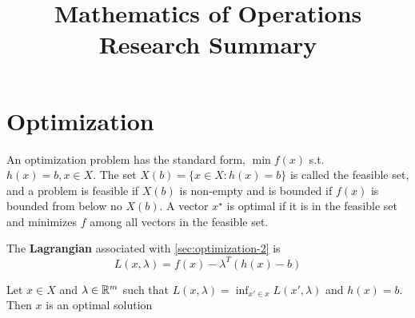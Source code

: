 

\title{Mathematics of Operations Research Summary}



\maketitle

\section{Optimization}
\label{sec:optimization}


\begin{defn}
  \label{sec:optimization-2}
  An optimization problem has the standard form, $\min f(x)$ s.t.
  $h(x) = b, x \in X$.  The set $X(b) = \{ x \in X : h(x) = b \} $ is
  called the feasible set, and a problem is feasible if $X(b)$ is
  non-empty and is bounded if $f(x)$ is bounded from below no $X(b)$.
  A vector $ x^{\star}$ is optimal if it is in the feasible set and
  minimizes $f$ among all vectors in the feasible set.
\end{defn}

\begin{defn}
  \label{sec:optimization-3}
  The \textbf{Lagrangian} associated with \ref{sec:optimization-2} is
  \begin{equation}
    \label{eq:1}
    L(x, \lambda) = f(x) - \lambda^{T} (h(x) - b)
  \end{equation}

\end{defn}

\begin{thm}
  \label{sec:optimization-1}
  Let $x \in X$ and $\lambda \in \mathbb{R}^{m}$ such that $L(x, \lambda) =
  \inf_{x' \in x} L(x', \lambda)$ and $h(x) = b$.  Then $x$ is an
  optimal solution 
\end{thm}

